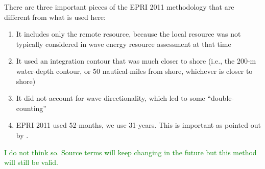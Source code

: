 There are three important pieces of the EPRI 2011 methodology that are different from what is used here:
\begin{enumerate}
\item It includes only the remote resource, because the local resource was not typically considered in wave energy resource assessment at that time
\item It used an integration contour that was much closer to shore (i.e., the 200-m water-depth contour, or 50 nautical-miles from shore, whichever is closer to shore)
\item It did not account for wave directionality, which led to some ``double-counting'' \cite{nationalresearchcouncilEvaluationDepartmentEnergy2013}
\item EPRI 2011 used 52-months, we use 31-years. This is important as pointed out by \cite{yangCharacteristicsVariabilityNearshore2020}.
\end{enumerate}
 \textcolor{green}{I do not think so. Source terms will keep changing in the future but this method will still be valid.}


